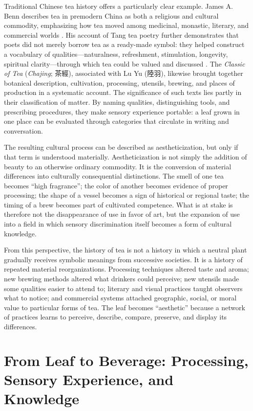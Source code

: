 \documentclass[numbers]{IntechOpen-Book}
\newcommand{\zh}[1]{{\CJKfontspec{Noto Serif CJK SC}\upshape #1}}
\begin{document}
Traditional Chinese tea history offers a particularly clear example. James A. Benn describes tea in premodern China as both a religious and cultural commodity, emphasizing how tea moved among medicinal, monastic, literary, and commercial worlds \cite{benn}. His account of Tang tea poetry further demonstrates that poets did not merely borrow tea as a ready-made symbol: they helped construct a vocabulary of qualities---naturalness, refreshment, stimulation, longevity, spiritual clarity---through which tea could be valued and discussed \cite{bennpoetry}. The \textit{Classic of Tea} (\textit{Chajing}; \zh{茶經}), associated with Lu Yu (\zh{陸羽}), likewise brought together botanical description, cultivation, processing, utensils, brewing, and places of production in a systematic account. The significance of such texts lies partly in their classification of matter. By naming qualities, distinguishing tools, and prescribing procedures, they make sensory experience portable: a leaf grown in one place can be evaluated through categories that circulate in writing and conversation.

The resulting cultural process can be described as aestheticization, but only if that term is understood materially. Aestheticization is not simply the addition of beauty to an otherwise ordinary commodity. It is the conversion of material differences into culturally consequential distinctions. The smell of one tea becomes ``high fragrance''; the color of another becomes evidence of proper processing; the shape of a vessel becomes a sign of historical or regional taste; the timing of a brew becomes part of cultivated competence. What is at stake is therefore not the disappearance of use in favor of art, but the expansion of use into a field in which sensory discrimination itself becomes a form of cultural knowledge.

From this perspective, the history of tea is not a history in which a neutral plant gradually receives symbolic meanings from successive societies. It is a history of repeated material reorganizations. Processing techniques altered taste and aroma; new brewing methods altered what drinkers could perceive; new utensils made some qualities easier to attend to; literary and visual practices taught observers what to notice; and commercial systems attached geographic, social, or moral value to particular forms of tea. The leaf becomes ``aesthetic'' because a network of practices learns to perceive, describe, compare, preserve, and display its differences.

\section{From Leaf to Beverage: Processing, Sensory Experience, and Knowledge}
\end{document}
